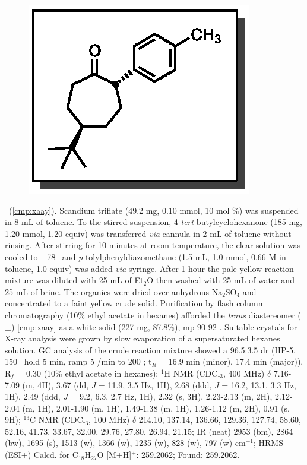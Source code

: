 \vspace{10pt}
\begin{figure}
  \vspace{-32pt}
  \begin{center}
    \includegraphics[scale=0.8]{chp_asymmetric/images/xaax}
  \end{center}
  \vspace{-35pt}
\end{figure}\noindent \textbf{\CMPxaax}\ (\ref{cmp:xaay}). Scandium triflate
(49.2 mg, 0.10 mmol, 10 mol \%) was suspended in 8 mL of toluene. To the stirred
suspension, 4-\textit{tert}-butylcyclohexanone (185 mg, 1.20 mmol, 1.20 equiv)
was transferred \textit{via} cannula in 2 mL of toluene without rinsing. After
stirring for 10 minutes at room temperature, the clear solution was cooled to
$-$78 \degc\ and \textit{p}-tolylphenyldiazomethane (1.5 mL, 1.0 mmol, 0.66 M in
toluene, 1.0 equiv) was added \textit{via} syringe. After 1 hour the pale yellow
reaction mixture was diluted with 25 mL of Et$_2$O then washed with 25 mL of
water and 25 mL of brine. The organics were dried over anhydrous Na$_2$SO$_4$
and concentrated to a faint yellow crude solid. Purification by flash column
chromatography (10\% ethyl acetate in hexanes) afforded the \textit{trans}
diastereomer ($\pm$)-\ref{cmp:xaay} as a white solid (227 mg, 87.8\%), mp 90-92 \degc.
Suitable crystals for X-ray analysis were grown by slow evaporation of a supersaturated hexanes solution. GC analysis of the crude reaction mixture showed a 96.5:3.5 dr (HP-5, 150 \degc\ hold 5 min, ramp 5 \degc/min to 200 \degc; t$_R$ = 16.9 min (minor), 17.4 min (major)). \\
R$_f$ = 0.30 (10\% ethyl acetate in hexanes); $^1$H NMR (CDCl$_3$, 400 MHz)
$\delta$ 7.16-7.09 (m, 4H), 3.67 (dd, \textit{J} = 11.9, 3.5 Hz, 1H), 2.68 (ddd,
\textit{J} =  16.2, 13.1, 3.3 Hz, 1H), 2.49 (ddd, \textit{J} = 9.2, 6.3, 2.7 Hz,
1H), 2.32 (s, 3H), 2.23-2.13 (m, 2H), 2.12-2.04 (m, 1H), 2.01-1.90 (m, 1H), 1.49-1.38 (m, 1H), 1.26-1.12 (m, 2H), 0.91 (s, 9H); $^{13}$C NMR (CDCl$_3$, 100 MHz) $\delta$ 214.10, 137.14, 136.66, 129.36, 127.74, 58.60, 52.16, 41.73, 33.67, 32.00, 29.76, 27.80, 26.94, 21.15; IR (neat) 2953 (bm), 2864 (bw), 1695 (s), 1513 (w), 1366 (w), 1235 (w), 828 (w), 797 (w) cm$^{-1}$; HRMS (ESI+) Calcd. for C$_{18}$H$_{27}$O [M+H]$^+$: 259.2062; Found: 259.2062.


